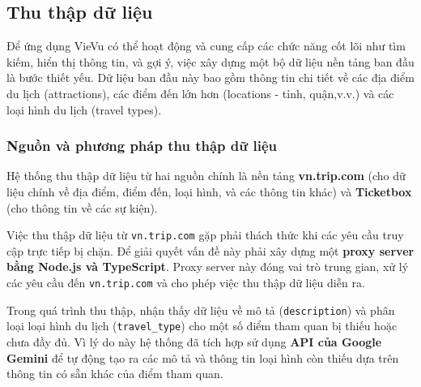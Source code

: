 \subsection{Thu thập dữ liệu}


Để ứng dụng VieVu có thể hoạt động và cung cấp các chức năng cốt lõi như tìm kiếm, hiển thị thông tin, và gợi ý, việc xây dựng một bộ dữ liệu nền tảng ban đầu là bước thiết yếu. Dữ liệu ban đầu này bao gồm thông tin chi tiết về các địa điểm du lịch (attractions), các điểm đến lớn hơn (locations - tỉnh, quận,v.v.) và các loại hình du lịch (travel types).

\subsubsection{Nguồn và phương pháp thu thập dữ liệu}
Hệ thống thu thập dữ liệu từ hai nguồn chính là nền tảng \textbf{vn.trip.com} (cho dữ liệu chính về địa điểm, điểm đến, loại hình, và các thông tin khác) và \textbf{Ticketbox} (cho thông tin về các sự kiện).

Việc thu thập dữ liệu từ \texttt{vn.trip.com} gặp phải thách thức khi các yêu cầu truy cập trực tiếp bị chặn. Để giải quyết vấn đề này phải xây dựng một \textbf{proxy server bằng Node.js và TypeScript}. Proxy server này đóng vai trò trung gian, xử lý các yêu cầu đến \texttt{vn.trip.com} và cho phép việc thu thập dữ liệu diễn ra.

Trong quá trình thu thập, nhận thấy dữ liệu về mô tả (\texttt{description}) và phân loại loại hình du lịch (\texttt{travel\_type}) cho một số điểm tham quan bị thiếu hoặc chưa đầy đủ. Vì lý do này hệ thống đã tích hợp sử dụng \textbf{API của Google Gemini} để tự động tạo ra các mô tả và thông tin loại hình còn thiếu dựa trên thông tin có sẵn khác của điểm tham quan.


